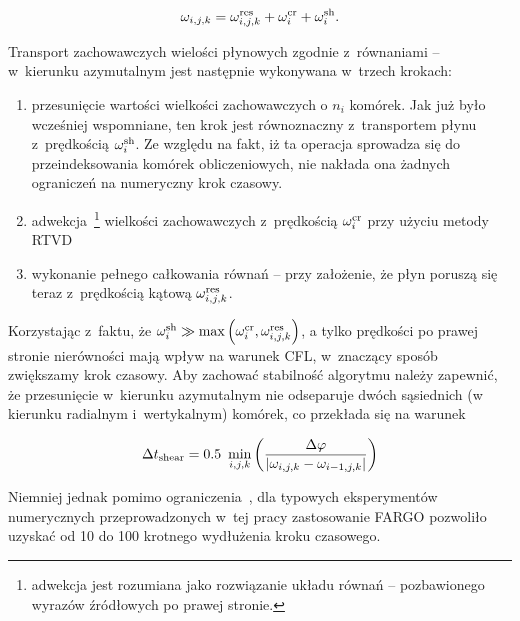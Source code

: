 \begin{equation}
   \omega_{i,j,k} = \omega_{i,j,k}^{\rm res} + \omega_i^{\rm cr} + \omega_i^{\rm
sh}.
\end{equation}

Transport zachowawczych wielości płynowych zgodnie z~równaniami  --
 w~kierunku azymutalnym jest następnie wykonywana w~trzech krokach:

\begin{enumerate}
   \item przesunięcie wartości wielkości zachowawczych o $n_i$ komórek. Jak już
      było wcześniej wspomniane, ten krok jest równoznaczny z~transportem płynu
      z~prędkością $\omega_i^{\rm sh}$. Ze względu na fakt, iż ta operacja
      sprowadza się do przeindeksowania komórek obliczeniowych, nie nakłada ona
      żadnych ograniczeń na numeryczny krok czasowy.
   \item adwekcja~\footnote{adwekcja jest rozumiana jako rozwiązanie układu
      równań  --  pozbawionego wyrazów źródłowych po prawej
      stronie.} wielkości zachowawczych z~prędkością $\omega_i^{\rm cr}$ przy
      użyciu metody RTVD
   \item wykonanie pełnego całkowania równań  --  przy
      założenie, że płyn poruszą się teraz z~prędkością kątową
      $\omega_{i,j,k}^{\rm res}$.
\end{enumerate}
Korzystając z~faktu, że $\omega_i^{\rm sh} \gg \max\left(\omega_i^{\rm cr},
\omega_{i,j,k}^{\rm res}\right)$, a tylko prędkości po prawej stronie
nierówności mają wpływ na warunek CFL, w~znaczący sposób zwiększamy krok
czasowy. Aby zachować stabilność algorytmu należy zapewnić, że
przesunięcie w~kierunku azymutalnym nie odseparuje dwóch sąsiednich (w kierunku
radialnym i~wertykalnym) komórek, co przekłada się na warunek

\begin{equation}\label{eq:tshear}
   \Delta t_{\rm shear} = 0.5 ~ \min_{i,j,k} \left( \frac{\Delta\varphi}
   {|\omega_{i,j,k} - \omega_{i-1,j,k}|} \right)
\end{equation}

Niemniej jednak pomimo ograniczenia~, dla typowych eksperymentów
numerycznych przeprowadzonych w~tej pracy zastosowanie FARGO pozwoliło uzyskać
od 10 do 100 krotnego wydłużenia kroku czasowego.


